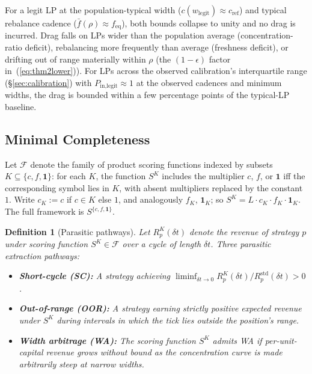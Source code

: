 \documentclass[11pt,a4paper]{article}
\theoremstyle{cgdefinition}
\newtheorem{definition}{Definition}
\theoremstyle{cgplain}
\theoremstyle{cgremark}
\begin{document}
For a legit LP at the population-typical width ($c(w_{\text{legit}}) \approx c_{\text{ref}}$) and typical rebalance cadence ($\bar f(\rho) \approx f_{\text{eq}}$), both bounds collapse to unity and no drag is incurred. Drag falls on LPs wider than the population average (concentration-ratio deficit), rebalancing more frequently than average (freshness deficit), or drifting out of range materially within $\rho$ (the $(1-\epsilon)$ factor in~(\ref{eq:thm2lower})). For LPs across the observed calibration's interquartile range (\S\ref{sec:calibration}) with $P_{\text{in,legit}} \approx 1$ at the observed cadences and minimum widths, the drag is bounded within a few percentage points of the typical-LP baseline.

\subsection{Minimal Completeness}\label{sec:mincomplete}

Let $\mathcal{F}$ denote the family of product scoring functions indexed by subsets $K \subseteq \{c, f, \mathbf{1}\}$: for each $K$, the function $S^K$ includes the multiplier $c$, $f$, or $\mathbf{1}$ iff the corresponding symbol lies in $K$, with absent multipliers replaced by the constant~$1$. Write $c_K := c$ if $c \in K$ else $1$, and analogously $f_K$, $\mathbf{1}_K$; so $S^K = L \cdot c_K \cdot f_K \cdot \mathbf{1}_K$. The full framework is $S^{\{c, f, \mathbf{1}\}}$.

\begin{definition}[Parasitic pathways]\label{def:pathways}
Let $R^K_p(\delta t)$ denote the revenue of strategy $p$ under scoring function $S^K \in \mathcal{F}$ over a cycle of length $\delta t$. Three parasitic extraction pathways:
\begin{itemize}[leftmargin=2em]
\item \textbf{Short-cycle (SC):} A strategy achieving $\liminf_{\delta t \to 0} R^K_p(\delta t) / R^{\text{std}}_p(\delta t) > 0$.
\item \textbf{Out-of-range (OOR):} A strategy earning strictly positive expected revenue under $S^K$ during intervals in which the tick lies outside the position's range.
\item \textbf{Width arbitrage (WA):} The scoring function $S^K$ admits WA if per-unit-capital revenue grows without bound as the concentration curve is made arbitrarily steep at narrow widths.
\end{itemize}
\end{definition}
\end{document}
